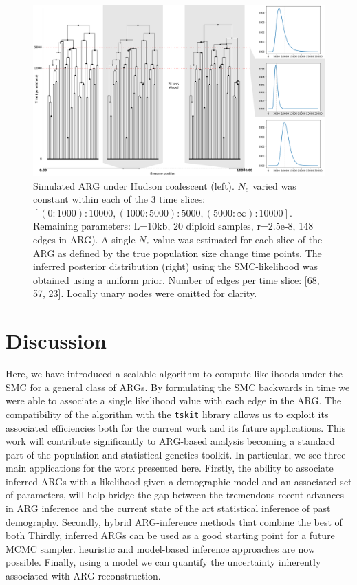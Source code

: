 \documentclass{article}
\begin{document}
\begin{figure}[!ht]
\centering
\includegraphics[width=\textwidth]{figures/3-slices.png}
\caption{Simulated ARG under Hudson coalescent (left). $N_e$ varied was constant within each of the 3 time slices: $[(0:1000): 10 000, (1000:5000): 5000, (5000:\infty):10 000]$. Remaining parameters: L=10kb, 20 diploid samples, r=2.5e-8, 148 edges in ARG). A single $N_e$ value was estimated for each slice of the ARG as defined by the true population size change time points. The inferred posterior distribution (right) using the SMC-likelihood was obtained using a uniform prior. Number of edges per time slice: [68, 57, 23]. Locally unary nodes were omitted for clarity.}
\label{fig:3-arg-slices}
\end{figure}
 
\section{Discussion}

Here, we have introduced a scalable algorithm to compute likelihoods 
under the SMC for a general class of ARGs. By formulating the SMC backwards in time 
we were able to associate a single likelihood value with each edge in the ARG. 
The compatibility of the algorithm with the \texttt{tskit} library allows us to 
exploit its associated efficiencies both for the current work and its future 
applications. This work will contribute significantly 
to ARG-based analysis becoming a standard part of the population 
and statistical genetics toolkit. 
In particular, we see three main applications for the work presented here. 
Firstly, the ability to associate inferred ARGs with a likelihood given a demographic 
model and an associated set of parameters, will help bridge the gap between the tremendous recent 
advances in ARG inference and the current state of the art statistical inference of 
past demography. 
Secondly, hybrid ARG-inference methods that combine the best of both 
Thirdly, inferred ARGs can be used as a good starting point for a future MCMC sampler.
heuristic and model-based inference approaches are now possible.
Finally, using a model we can quantify the uncertainty inherently associated 
with ARG-reconstruction.
\end{document}
